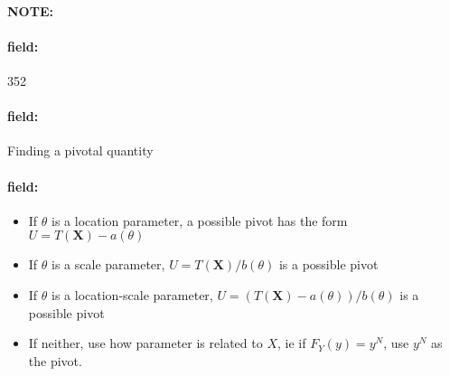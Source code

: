 \documentclass[12pt]{article}
\newenvironment{note}{\paragraph{NOTE:}}{}
\newenvironment{field}{\paragraph{field:}}{}
\begin{document}
\begin{note}
    \begin{field}
        \tiny 352
    \end{field}
    \begin{field}
        Finding a pivotal quantity
    \end{field}
    \begin{field}
        \begin{itemize}
          \item If $\theta$ is a location parameter, a possible pivot has the form $U = T(\mathbf{X}) - a (\theta)$
          \item If $\theta$ is a scale parameter, $U = T(\mathbf{X})/b(\theta)$ is a possible pivot
          \item If $\theta$ is a location-scale parameter, $U = (T(\mathbf{X}) - a(\theta))/b(\theta)$ is a possible pivot
          \item If neither, use how parameter is related to $X$, ie if $F_Y(y) = y^N$, use $y^N$ as the pivot.
        \end{itemize}
    \end{field}
\end{note}
\end{document}
